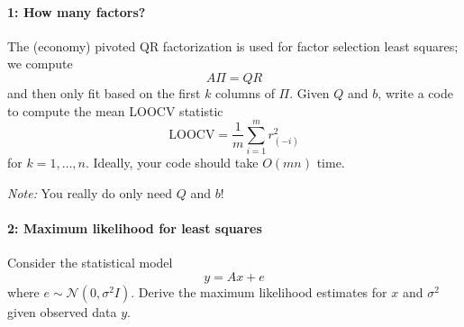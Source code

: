 \documentclass[12pt, leqno]{article} %
\begin{document}

\paragraph*{1: How many factors?}
The (economy) pivoted QR factorization is used for factor selection
least squares; we compute
\[
  A \Pi = QR
\]
and then only fit based on the first $k$ columns of $\Pi$.
Given $Q$ and $b$, write a code to compute the mean LOOCV statistic
\[
  \mbox{LOOCV} = \frac{1}{m} \sum_{i=1}^m r_{(-i)}^2
\]
for $k = 1, \ldots, n$.  Ideally, your code should take $O(mn)$ time.

{\em Note:} You really do only need $Q$ and $b$!

\paragraph*{2: Maximum likelihood for least squares}
Consider the statistical model
\[
  y = Ax + e
\]
where $e \sim \mathcal{N}(0, \sigma^2 I)$.  Derive the maximum
likelihood estimates for $x$ and $\sigma^2$ given observed data $y$.
\end{document}
